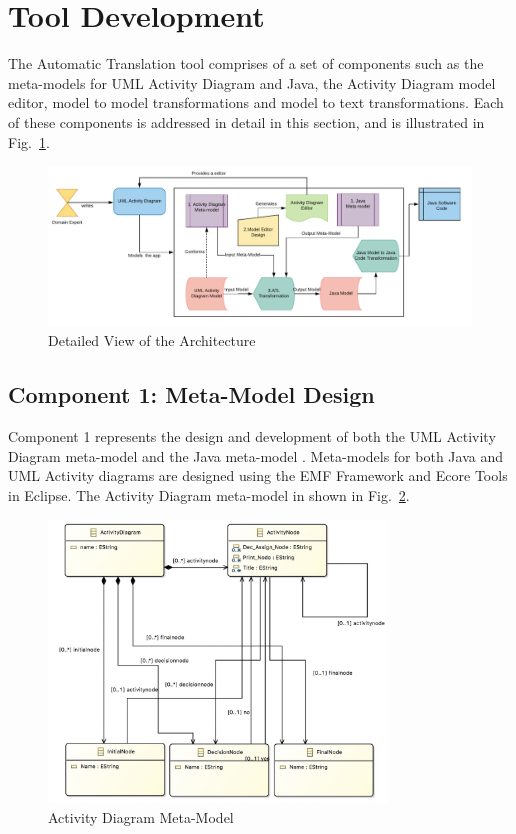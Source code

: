 \section{Tool Development}
\label{Development}

The Automatic Translation tool comprises of a set of components such as the meta-models for UML Activity Diagram and Java, the Activity Diagram model editor, model to model transformations and model to text transformations. Each of these components is addressed in detail in this section, and is illustrated in Fig.~\ref{figure:overalltool}.

\begin{figure}[!h]
	\includegraphics[width=\textwidth]{figs/Architecture_Proposed_Solution}
	\caption{Detailed View of the Architecture}
	\label{figure:overalltool}
\end{figure}

\subsection{Component 1: Meta-Model Design}
\label{Component1}
Component 1 represents the design and development of both the UML Activity Diagram meta-model and the Java meta-model \cite{perera2018thesis}. Meta-models for both Java and UML Activity diagrams are designed using the EMF Framework and Ecore Tools in Eclipse. The Activity Diagram meta-model in shown in Fig.~\ref{figure:ADMetaModel}. 

\begin{figure}[!h]
\centering
	\includegraphics[width=0.8\textwidth]{figs/Activity_Diagram_Meta_Model}
	\caption{Activity Diagram Meta-Model}
	\label{figure:ADMetaModel}
\end{figure}

